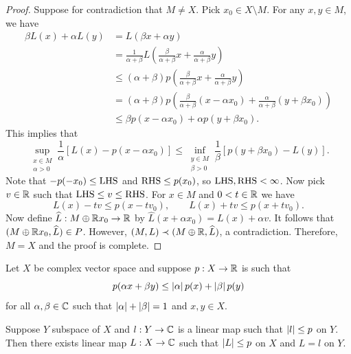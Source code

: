 \documentclass[a4paper]{article}
\begin{document}
\begin{proof}
  Suppose for contradiction that $M \neq X$. Pick $x_0 \in X \setminus M$.
  For any $x, y \in M$, we have
  \[
    \begin{aligned}
      \beta L(x) + \alpha L(y)
       & = L(\beta x + \alpha y)                                 \\
       & = \frac{1}{\alpha + \beta} L \left(
      \frac{\beta}{\alpha + \beta} x + \frac{\alpha}{\alpha + \beta} y
      \right)                                                    \\
       & \leq (\alpha + \beta) p \left(
      \frac{\beta}{\alpha + \beta} x + \frac{\alpha}{\alpha + \beta} y
      \right)                                                    \\
       & = (\alpha + \beta) p \left(
      \frac{\beta}{\alpha + \beta} (x - \alpha x_0)
      + \frac{\alpha}{\alpha + \beta} (y + \beta x_0)
      \right)                                                    \\
       & \leq \beta p(x - \alpha x_0) + \alpha p(y + \beta x_0).
    \end{aligned}
  \]
  This implies that
  \[
    \sup_{\substack{x \in M \\ \alpha > 0}}
    \frac{1}{\alpha} \left[ L(x) - p(x - \alpha x_0) \right]
    \leq \inf_{\substack{y \in M \\ \beta > 0}}
    \frac{1}{\beta} \left[ p(y + \beta x_0) - L(y) \right].
  \]
  Note that $-p(-x_0) \leq \operatorname{LHS}$ and $\operatorname{RHS} \leq p(x_0)$, so $\operatorname{LHS}, \operatorname{RHS} <
  \infty$. Now pick $v \in \mathbb{R}$ such that $\operatorname{LHS} \leq v \leq \operatorname{RHS}$. For $x
  \in M$ and $0 < t \in \mathbb{R}$ we have
  \[
    L(x) - tv \leq p(x - t v_0), \qquad
    L(x) + tv \leq p(x + t v_0).
  \]
  Now define $\widehat{L}: M \oplus \mathbb{R} x_0 \to \mathbb{R}$ by $\hat{L}(x + \alpha x_0)
  = L(x) + \alpha v$. It follows that $(M \oplus \mathbb{R} x_0 , \widehat{L}) \in P$.
  However, $(M, L) \prec (M \oplus \mathbb{R}, \widehat{L})$, a contradiction.
  Therefore, $M = X$ and the proof is complete.

\end{proof}

\begin{thm}
  Let $X$ be complex vector space and suppose $p: X \to \mathbb{R}$
  is such that
  \[
    p(\alpha x + \beta y) \leq \left\lvert \alpha\right\rvert p(x) + \left\lvert \beta\right\rvert p(y)
  \]
  for all $\alpha, \beta \in \mathbb{C}$ such that $\left\lvert \alpha\right\rvert + \left\lvert \beta\right\rvert=1$
  and $x, y \in X$.

  Suppose $Y$ subspace of $X$ and $l: Y \to \mathbb{C}$ is a linear map such that
  $\left\lvert l\right\rvert \leq p$ on $Y$. Then there exists linear map $L: X \to \mathbb{C}$ such
  that $\left\lvert L\right\rvert \leq p$ on $X$ and $L = l$ on $Y$.
\end{thm}
\end{document}
